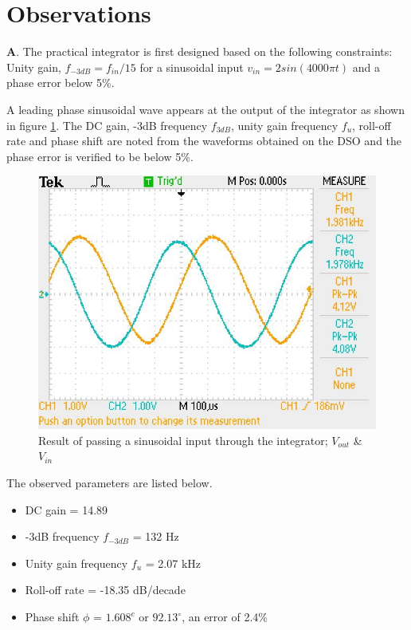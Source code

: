\documentclass[12pt, titlepage]{article}
\theoremstyle{definition}
\begin{document}
  \newpage
  \section{Observations}
    \textbf{A}. The practical integrator is first designed based on the following constraints:
    Unity gain, $f_{-3dB} = f_{in}/15$ for a sinusoidal input
    $v_{in} = 2 sin(4000\pi t)$ and a phase error below 5\%.

    A leading phase sinusoidal wave appears at the output of the integrator as shown in figure \ref{fig:results_q1}.
    The DC gain, -3dB frequency $f_{3dB}$, unity gain frequency $f_u$, roll-off rate and phase shift are noted from the waveforms obtained on the DSO and the phase error is verified to be below 5\%.

    \begin{figure}
      \includegraphics[scale=0.25]{images/results_q1.jpeg}
      \caption{Result of passing a sinusoidal input through the integrator; \color{cyan}$V_{out}$ \color{black}\& \color{orange}$V_{in}$}
      \label{fig:results_q1}
    \end{figure}

    The observed parameters are listed below.
    \begin{itemize}
      \item[] DC gain = 14.89
      \item[] -3dB frequency $f_{-3dB}$ = 132 Hz
      \item[] Unity gain frequency $f_u$ = 2.07 kHz
      \item[] Roll-off rate = -18.35 dB/decade
      \item[] Phase shift $\phi$ = $1.608^{c}$ or $92.13^{\circ}$, an error of 2.4\%
    \end{itemize}
\end{document}
